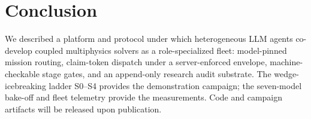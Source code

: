 \section{Conclusion}\label{sec:conclusion}

We described a platform and protocol under which heterogeneous LLM
agents co-develop coupled multiphysics solvers as a role-specialized
fleet: model-pinned mission routing, claim-token dispatch under a
server-enforced envelope, machine-checkable stage gates, and an
append-only research audit substrate. The wedge-icebreaking ladder
S0--S4 provides the demonstration campaign; the seven-model bake-off
and fleet telemetry provide the measurements.  Code and campaign artifacts will
be released upon publication.
